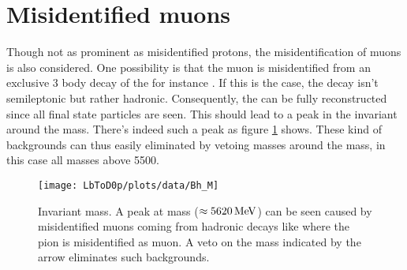 \section{Misidentified muons}
Though not as prominent as misidentified protons, the misidentification of muons is also considered.
One possibility is that the muon is misidentified from an exclusive 3 body decay of the \Lb for instance \decay{\Lb}{\Dz\proton\pim}.
If this is the case, the decay isn't semileptonic but rather hadronic.
Consequently, the \Lb can be fully reconstructed since all final state particles are seen.
This should lead to a peak in the invariant \Dz\proton\mun around the \Lb mass.
There's indeed such a peak as figure \ref{fig:plot_D0pmuMass} shows.
These kind of backgrounds can thus easily eliminated by vetoing \Dz\proton\muon masses around the \Lb mass, in this case all masses above 5500\mev.
\begin{figure}[hptb]
	\centering
	\texttt{[image: LbToD0p/plots/data/Bh\_M]}
	\caption{Invariant \Dz\proton\mun mass. A peak at \Lb mass ($\approx 5620 \mathrm{\,Me\kern -0.1em V}$) can be seen caused by misidentified muons coming from hadronic decays like \decay{\Lb}{\Dz\proton\pi} where the pion is misidentified as muon. 
             A veto on the \Dz\proton\mun mass indicated by the arrow eliminates such backgrounds.}
	\label{fig:plot_D0pmuMass}
\end{figure}


